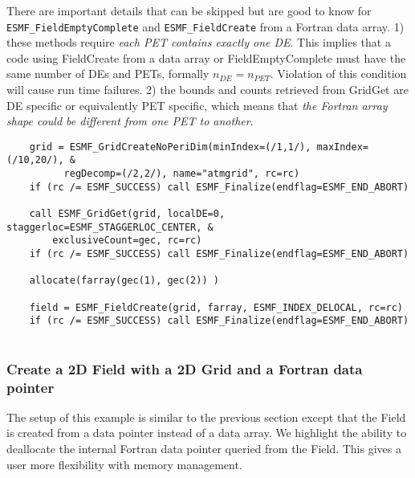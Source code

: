     \begin{sloppypar}
    There are important details that can be skipped but are good to know for {\tt ESMF\_FieldEmptyComplete}
    and {\tt ESMF\_FieldCreate} from a Fortran data array. 1) these methods require {\em each PET contains
    exactly one DE}. This implies that a code using FieldCreate from a data array or FieldEmptyComplete must
    have the same number of DEs and PETs, formally $n_{DE} = n_{PET}$. Violation of this condition
    will cause run time failures. 2) the bounds and counts retrieved from GridGet are DE specific
    or equivalently PET specific, which means that {\em the Fortran array shape could be different from one
    PET to another}. 
    \end{sloppypar}
     

 \begin{verbatim}
    grid = ESMF_GridCreateNoPeriDim(minIndex=(/1,1/), maxIndex=(/10,20/), &
          regDecomp=(/2,2/), name="atmgrid", rc=rc)
    if (rc /= ESMF_SUCCESS) call ESMF_Finalize(endflag=ESMF_END_ABORT)

    call ESMF_GridGet(grid, localDE=0, staggerloc=ESMF_STAGGERLOC_CENTER, &
        exclusiveCount=gec, rc=rc)
    if (rc /= ESMF_SUCCESS) call ESMF_Finalize(endflag=ESMF_END_ABORT)

    allocate(farray(gec(1), gec(2)) )

    field = ESMF_FieldCreate(grid, farray, ESMF_INDEX_DELOCAL, rc=rc)
    if (rc /= ESMF_SUCCESS) call ESMF_Finalize(endflag=ESMF_END_ABORT)
 
\end{verbatim}
 

  \subsubsection{Create a 2D Field with a 2D Grid and a Fortran data pointer}
  \label{sec:field:usage:create_2dptr}
  
   The setup of this example is similar to the previous section except 
   that the Field is created from a data pointer instead of a data array.
   We highlight the ability to deallocate the internal Fortran data
   pointer queried from the Field. This gives a user more flexibility with
   memory management.
   

